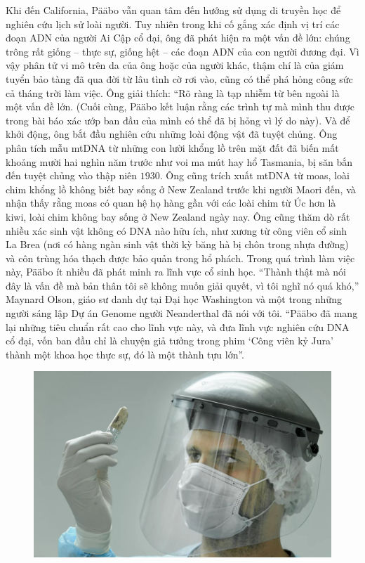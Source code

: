 \begin{multicols}{2}
	\vskip 0.2cm
	\vskip 0.2cm
	Khi đến California, Pääbo vẫn quan tâm đến hướng sử dụng di truyền học để nghiên cứu lịch sử loài người. Tuy nhiên trong khi cố gắng xác định vị trí các đoạn ADN của người Ai Cập cổ đại, ông đã phát hiện ra một vấn đề lớn: chúng trông rất giống -- thực sự, giống hệt -- các đoạn ADN của con người đương đại. Vì vậy phân tử vi mô trên da của ông hoặc của người khác, thậm chí là của giám tuyển bảo tàng đã qua đời từ lâu tình cờ rơi vào, cũng có thể phá hỏng công sức cả tháng trời làm việc.
	\vskip 0.1cm
	Ông giải thích: “Rõ ràng là tạp nhiễm từ bên ngoài là một vấn đề lớn. (Cuối cùng, Pääbo kết luận rằng các trình tự mà mình thu được trong bài báo xác ướp ban đầu của mình có thể đã bị hỏng vì lý do này). Và để khởi động, ông bắt đầu nghiên cứu những loài động vật đã tuyệt chủng. Ông phân tích mẫu mtDNA từ những con lười khổng lồ trên mặt đất đã biến mất khoảng mười hai nghìn năm trước như voi ma mút hay hổ Tasmania, bị săn bắn đến tuyệt chủng vào thập niên $1930$. Ông cũng trích xuất mtDNA từ moas, loài chim khổng lồ không biết bay sống ở New Zealand trước khi người Maori đến, và nhận thấy rằng moas có quan hệ họ hàng gần với các loài chim từ Úc hơn là kiwi, loài chim không bay sống ở New Zealand ngày nay. Ông cũng thăm dò rất nhiều xác sinh vật không có DNA nào hữu ích, như xương từ công viên cổ sinh La Brea (nơi có hàng ngàn sinh vật thời kỳ băng hà bị chôn trong nhựa đường) và côn trùng hóa thạch được bảo quản trong hổ phách. Trong quá trình làm việc này, Pääbo ít nhiều đã phát minh ra lĩnh vực cổ sinh học.
	\vskip 0.1cm
	“Thành thật mà nói đây là vấn đề mà bản thân tôi sẽ không muốn giải quyết, vì tôi nghĩ nó quá khó,” Maynard Olson, giáo sư danh dự tại Đại học Washington và một trong những người sáng lập Dự án Genome người Neanderthal đã nói với tôi. “Pääbo đã mang lại những tiêu chuẩn rất cao cho lĩnh vực này, và đưa lĩnh vực nghiên cứu DNA cổ đại, vốn ban đầu chỉ là chuyện giả tưởng trong phim ‘Công viên kỷ Jura’ thành một khoa học thực sự, đó là một thành tựu lớn”.
	\begin{figure}[H]
		\vspace*{-5pt}
		\centering
		\captionsetup{labelformat= empty, justification=centering}
		\includegraphics[width= 1\linewidth]{3}

\end{figure}
\end{multicols}
